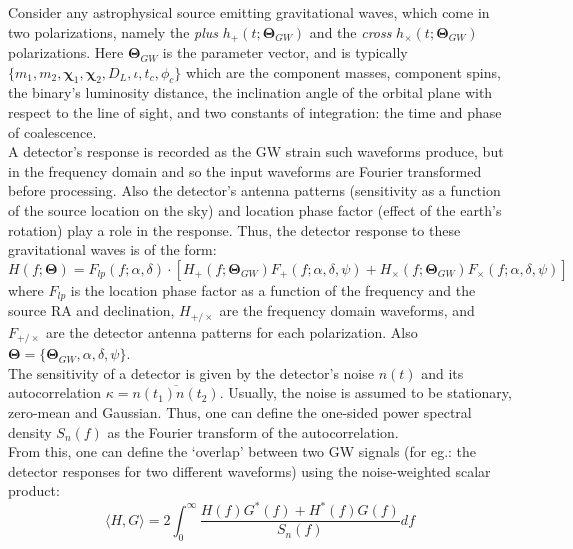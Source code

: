     Consider any astrophysical source emitting gravitational waves, which come in two
    polarizations, namely the \emph{plus} $h_{+}(t; \mathbf{\Theta}_{GW})$ and the
    \emph{cross} $h_{\times}(t; \mathbf{\Theta}_{GW})$ polarizations. Here
    $\mathbf{\Theta}_{GW}$ is the parameter vector, and is typically $\{m_1, m_2,
    \mathbf{\chi}_1, \mathbf{\chi}_2, D_L, \iota, t_c, \phi_c\}$ which are the component
    masses, component spins, the binary's luminosity distance, the inclination angle
    of the orbital plane with respect to the line of sight, and two constants of
    integration: the time and phase of coalescence.\\
    A detector's response is recorded as the GW strain such waveforms produce, but in
    the frequency domain and so the input waveforms are Fourier transformed before
    processing. Also the detector's antenna patterns (sensitivity as a function of the
    source location on the sky) and location phase factor (effect of the earth's
    rotation) play a role in the response. Thus, the detector response to these
    gravitational waves is of the form:
    \begin{equation}
        H(f; \mathbf{\Theta}) =
            F_{lp}(f; \alpha, \delta) \cdot
            [
                H_{+}(f; \mathbf{\Theta}_{GW}) F_{+}(f; \alpha, \delta, \psi) +
                H_{\times}(f; \mathbf{\Theta}_{GW}) F_{\times}(f; \alpha, \delta, \psi)
            ]
    \end{equation}
    where $F_{lp}$ is the location phase factor as a function of the frequency and the
    source RA and declination, $H_{+/\times}$ are the frequency domain waveforms, and
    $F_{+/\times}$ are the detector antenna patterns for each polarization. Also
    $\mathbf{\Theta} = \{\mathbf{\Theta}_{GW}, \alpha, \delta, \psi\}$.\\
    The sensitivity of a detector is given by the detector's noise $n(t)$ and its
    autocorrelation $\kappa = \overline{n(t_1)n(t_2)}$. Usually, the noise is assumed to
    be stationary, zero-mean and Gaussian. Thus, one can define the one-sided power
    spectral density $S_n(f)$ as the Fourier transform of the autocorrelation.\\
    From this, one can define the `overlap' between two GW signals (for eg.: the
    detector responses for two different waveforms) using the noise-weighted scalar
    product:
    \begin{equation}
        \langle H, G \rangle =
            2 \int_{0}^{\infty} \dfrac{H(f)G^{\ast}(f) + H^{\ast}(f)G(f)}{S_n(f)} df
    \end{equation}
